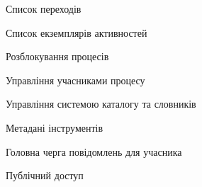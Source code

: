 \documentclass{memoir}
\begin{document}
\begin{figure}[h]
    \centering
    \caption{Список переходів}
    \label{fig:transition_list}
\end{figure}

\begin{figure}[h]
    \centering
    \caption{Список екземплярів активностей}
    \label{fig:activity_instances}
\end{figure}

\begin{figure}[h]
    \centering
    \caption{Розблокування процесів}
    \label{fig:process_unlock}
\end{figure}

\begin{figure}[h]
    \centering
    \caption{Управління учасниками процесу}
    \label{fig:participant_management}
\end{figure}

\begin{figure}[h]
    \centering
    \caption{Управління системою каталогу та словників}
    \label{fig:catalog_management}
\end{figure}

\begin{figure}[h]
    \centering
    \caption{Метадані інструментів}
    \label{fig:tool_metadata}
\end{figure}

\begin{figure}[h]
    \centering
    \caption{Головна черга повідомлень для учасника}
    \label{fig:participant_queue}
\end{figure}

\begin{figure}[h]
    \centering
    \caption{Публічний доступ}
    \label{fig:public_access}
\end{figure}
\end{document}
